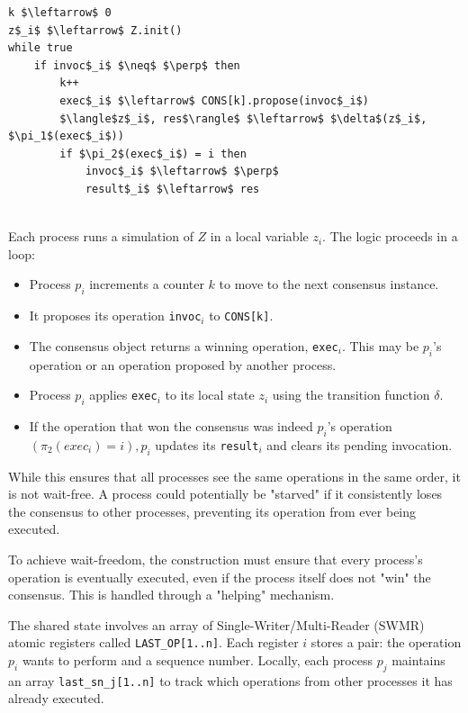\begin{minipage}{\textwidth}
\begin{lstlisting}[mathescape]
k $\leftarrow$ 0
z$_i$ $\leftarrow$ Z.init()
while true
    if invoc$_i$ $\neq$ $\perp$ then
        k++
        exec$_i$ $\leftarrow$ CONS[k].propose(invoc$_i$)
        $\langle$z$_i$, res$\rangle$ $\leftarrow$ $\delta$(z$_i$, $\pi_1$(exec$_i$))
        if $\pi_2$(exec$_i$) = i then
            invoc$_i$ $\leftarrow$ $\perp$
            result$_i$ $\leftarrow$ res
\end{lstlisting}
\end{minipage}\\

Each process runs a simulation of $Z$ in a local variable $z_i$. The logic proceeds in a loop:
\begin{itemize}
    \item Process $p_i$ increments a counter $k$ to move to the next consensus instance.
    \item It proposes its operation \texttt{invoc}$_i$ to \texttt{CONS[k]}.
    \item The consensus object returns a winning operation, \texttt{exec}$_i$. This may be $p_i$'s operation or an operation proposed by another process.
    \item Process $p_i$ applies \texttt{exec}$_i$ to its local state $z_i$ using the transition function $\delta$.
    \item If the operation that won the consensus was indeed $p_i$'s operation $(\pi_2(exec_i)=i), p_i$ updates its \texttt{result}$_i$ and clears its pending invocation.
\end{itemize}

While this ensures that all processes see the same operations in the same order, it is not wait-free. A process could potentially be "starved" if it consistently loses the consensus to other processes, preventing its operation from ever being executed.

To achieve wait-freedom, the construction must ensure that every process's operation is eventually executed, even if the process itself does not "win" the consensus. This is handled through a "helping" mechanism.

The shared state involves an array of Single-Writer/Multi-Reader (SWMR) atomic registers called \texttt{LAST\_OP[1..n]}. Each register $i$ stores a pair: the operation $p_i$ wants to perform and a sequence number. Locally, each process $p_j$ maintains an array \texttt{last\_sn\_j[1..n]} to track which operations from other processes it has already executed.

